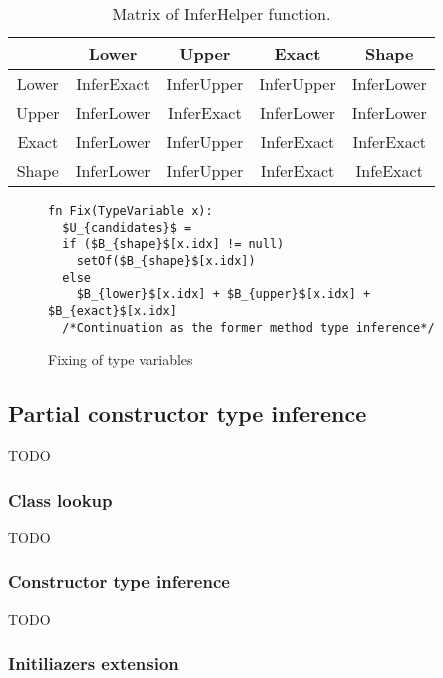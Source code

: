 \begin{table}[h!]
\begin{center}
\begin{tabular}{ | c | c | c | c | c | } 
  \hline
   & Lower & Upper & Exact & Shape\\
  \hline
  Lower & InferExact  &  InferUpper & InferUpper & InferLower \\
  \hline
  Upper & InferLower  &  InferExact & InferLower & InferLower \\
  \hline
  Exact & InferLower  &  InferUpper & InferExact & InferExact \\
  \hline
  Shape & InferLower  &  InferUpper & InferExact & InfeExact \\
  \hline
\end{tabular}
\end{center}
\caption{Matrix of InferHelper function.}
\label{table3:InferHelper}
\end{table}

\begin{figure}[h!]
\begin{lstlisting}[style=myAlgo, mathescape=true]
fn Fix(TypeVariable x):
  $U_{candidates}$ = 
  if ($B_{shape}$[x.idx] != null)
    setOf($B_{shape}$[x.idx])
  else
    $B_{lower}$[x.idx] + $B_{upper}$[x.idx] + $B_{exact}$[x.idx]
  /*Continuation as the former method type inference*/
\end{lstlisting}
\caption{Fixing of type variables}
\label{img55::mainTypeInference3}
\end{figure}

\subsection{Partial constructor type inference}

TODO

\subsubsection*{Class lookup}

TODO

\subsubsection*{Constructor type inference}

TODO

\subsubsection*{Initiliazers extension}

